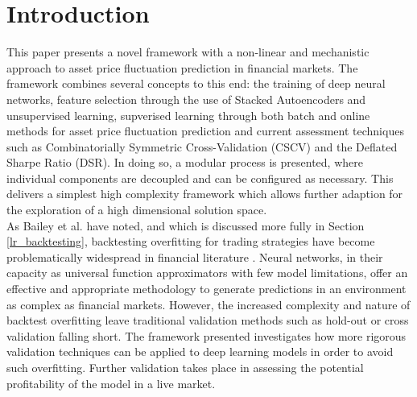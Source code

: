 \documentclass[a4paper,11pt,oneside]{article}
\theoremstyle{plain}
\theoremstyle{definition}
\begin{document}
	\listoftables
	
	\newpage
	
	
	\section{Introduction}\label{Introduction}
	
	
	This paper presents a novel framework with a non-linear and mechanistic approach to asset price fluctuation prediction in financial markets. The framework combines several concepts to this end: the training of deep neural networks, feature selection through the use of Stacked Autoencoders and unsupervised learning, supverised learning through both batch and online methods for asset price fluctuation prediction and current assessment techniques such as Combinatorially Symmetric Cross-Validation (CSCV) and the Deflated Sharpe Ratio (DSR). In doing so, a modular process is presented, where individual components are decoupled and can be configured as necessary. This delivers a simplest high complexity framework which allows further adaption for the exploration of a high dimensional solution space. 
	~\\\newline
	As Bailey et al. have noted, and which is discussed more fully in Section \ref{lr_backtesting}, backtesting overfitting for trading strategies have become problematically widespread in financial literature \cite{BailyPBO}. Neural networks, in their capacity as universal function approximators with few model limitations, offer an effective and appropriate methodology to generate predictions in an environment as complex as financial markets. However, the increased complexity and nature of backtest overfitting leave traditional validation methods such as hold-out or cross validation falling short. The framework presented investigates how more rigorous validation techniques can be applied to deep learning models in order to avoid such overfitting. Further validation takes place in assessing the potential profitability of the model in a live market.
	~\\\newline
\end{document}
